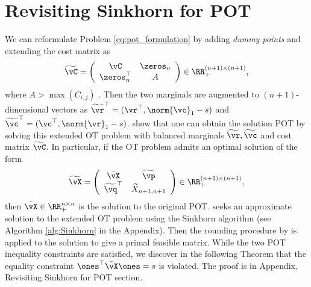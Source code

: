 \section{Revisiting Sinkhorn for POT} 
We can reformulate Problem \eqref{eq:pot_formulation} by adding \emph{dummy points} and extending the cost matrix as
\begin{align*}
    \widetilde{\vC} = \left(
    \begin{array}{cc}
    \vC & \zeros_{n} \\
    \zeros_{n}^\top & A
    \end{array} \right) \in \RR_{+}^{(n+1) \times (n+1)},
\end{align*}
where $A > \max(C_{i, j})$ \citep{Chapel-nips2020}. Then the two marginals are augmented to $(n+1)$-dimensional vectors as $\widetilde{\vr}^\top = (\vr^\top, \norm{\vc}_1 - s)$ and $\widetilde{\vc}^\top = (\vc^\top, \norm{\vr}_1 - s)$. \citep[Proposition 1]{Chapel-nips2020} show that one can obtain the solution POT by solving this extended OT problem with balanced marginals $\widetilde{\vr}, \widetilde{\vc}$ and cost matrix $\widetilde{\vC}$. In particular, if the OT problem admits an optimal solution of the form
\begin{align*}
    \widetilde{\vX} = \left(
    \begin{array}{cc}
    \bar{\vX} & \widetilde{\vp} \\
    \widetilde{\vq}^\top & \widetilde{X}_{n+1,n+1}
    \end{array} \right) \in \RR_{+}^{(n+1) \times (n+1)},
\end{align*}
then $\bar{\vX} \in \RR_{+}^{n \times n}$ is the solution to the original POT.
\citep{nhatho-mmpot} seeks an approximate solution to the extended OT problem using the Sinkhorn algorithm (see Algorithm \ref{alg:Sinkhorn} in the Appendix). Then the rounding procedure by \citep{altschuler2017near} is applied to the solution to give a primal feasible matrix. While the two POT inequality constraints are satisfied, we discover in the following Theorem that the equality constraint $\ones^\top \Bar{\vX} \ones = s$ is violated. The proof is in Appendix, Revisiting Sinkhorn for POT section.
